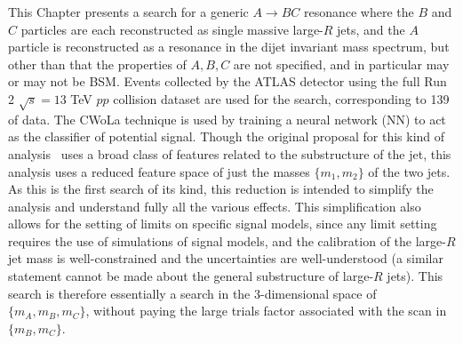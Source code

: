 This Chapter presents a search for a generic $A\rightarrow BC$ resonance where the $B$ and $C$ particles are each reconstructed as single massive large-$R$ jets, and the $A$ particle is reconstructed as a resonance in the dijet invariant mass spectrum, but other than that the properties of $A,B,C$ are not specified, and in particular may or may not be BSM.
Events collected by the ATLAS detector using the full Run 2 $\sqrt{s}=13$ TeV $pp$ collision dataset are used for the search, corresponding to 139\ifb{} of data.
The CWoLa technique is used by training a neural network (NN) to act as the classifier of potential signal.
Though the original proposal for this kind of analysis~\cite{Collins:2019jip} uses a broad class of features related to the substructure of the jet, this analysis uses a reduced feature space of just the masses $\{m_1,m_2\}$ of the two jets.
As this is the first search of its kind, this reduction is intended to simplify the analysis and understand fully all the various effects.
This simplification also allows for the setting of limits on specific signal models, since any limit setting requires the use of simulations of signal models, and the calibration of the large-$R$ jet mass is well-constrained and the uncertainties are well-understood (a similar statement cannot be made about the general substructure of large-$R$ jets).
This search is therefore essentially a search in the 3-dimensional space of $\{m_A,m_B,m_C\}$, without paying the large trials factor associated with the scan in $\{m_B,m_C\}$.

